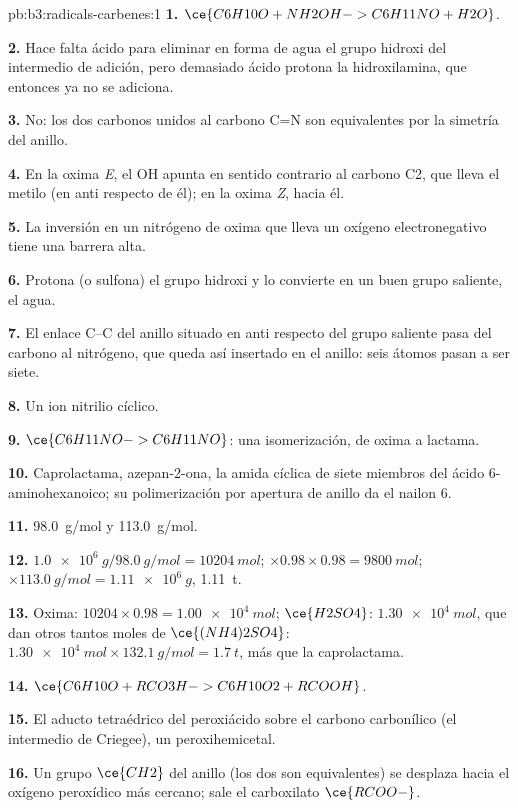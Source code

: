 \begin{solution}{pb:b3:radicals-carbenes:1}
\textbf{1.} $\ce{C6H10O + NH2OH -> C6H11NO + H2O}$.

\textbf{2.} Hace falta ácido para eliminar en forma de agua el grupo hidroxi del intermedio de adición,
pero demasiado ácido protona la hidroxilamina, que entonces ya no se adiciona.

\textbf{3.} No: los dos carbonos unidos al carbono C=N son equivalentes por la
simetría del anillo.

\textbf{4.} En la oxima \textit{E}, el OH apunta en sentido contrario al carbono C2, que lleva el metilo (en anti respecto de
él); en la oxima \textit{Z}, hacia él.

\textbf{5.} La inversión en un nitrógeno de oxima que lleva un oxígeno electronegativo tiene una barrera
alta.

\textbf{6.} Protona (o sulfona) el grupo hidroxi y lo convierte en un buen grupo
saliente, el agua.

\textbf{7.} El enlace C--C del anillo situado en anti respecto del grupo saliente pasa del carbono al nitrógeno,
que queda así insertado en el anillo: seis átomos pasan a ser siete.

\textbf{8.} Un ion nitrilio cíclico.

\textbf{9.} $\ce{C6H11NO -> C6H11NO}$: una isomerización, de oxima a lactama.

\textbf{10.} Caprolactama, azepan-2-ona, la amida cíclica de siete miembros del
ácido 6-aminohexanoico; su polimerización por apertura de anillo da el nailon 6.

\textbf{11.} \qty{98.0}{g/mol} y \qty{113.0}{g/mol}.

\textbf{12.} $\qty{1.0e6}{g}/\qty{98.0}{g/mol} = \qty{10204}{mol}$; $\times 0.98 \times 0.98 = \qty{9800}{mol}$; $\times \qty{113.0}{g/mol} = \qty{1.11e6}{g}$, \qty{1.11}{t}.

\textbf{13.} Oxima: $\num{10204} \times 0.98 = \qty{1.00e4}{mol}$; $\ce{H2SO4}$: $\qty{1.30e4}{mol}$, que dan otros tantos moles de
$\ce{(NH4)2SO4}$: $\qty{1.30e4}{mol} \times \qty{132.1}{g/mol} = \qty{1.7}{t}$, más que la caprolactama.

\textbf{14.} $\ce{C6H10O + RCO3H -> C6H10O2 + RCOOH}$.

\textbf{15.} El aducto tetraédrico del peroxiácido sobre el carbono carbonílico (el
intermedio de Criegee), un peroxihemicetal.

\textbf{16.} Un grupo $\ce{CH2}$ del anillo (los dos son equivalentes) se desplaza hacia el oxígeno peroxídico
más cercano; sale el carboxilato $\ce{RCOO-}$.


\end{solution}
